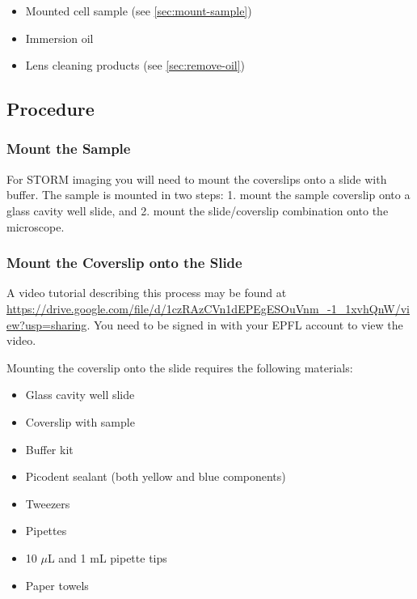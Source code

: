 \documentclass[10pt,a4paper,oneside]{book}
\begin{document}
\begin{itemize}
    \item{Mounted cell sample (see \autoref{sec:mount-sample})}
    \item{Immersion oil}
    \item{Lens cleaning products (see \autoref{sec:remove-oil})}
\end{itemize}

\subsection{Procedure}

\subsubsection{Mount the Sample}\label{sec:mount-sample}

For STORM imaging you will need to mount the coverslips onto a slide with buffer. The sample is mounted in two steps: 1. mount the sample coverslip onto a glass cavity well slide, and 2. mount the slide/coverslip combination onto the microscope.

\subsubsection{Mount the Coverslip onto the Slide}

\newline

A video tutorial describing this process may be found at \url{https://drive.google.com/file/d/1czRAzCVn1dEPEgESOuVnm_-1_1xvhQnW/view?usp=sharing}. You need to be signed in with your EPFL account to view the video.

Mounting the coverslip onto the slide requires the following materials:

\begin{itemize}
    \item{Glass cavity well slide}
    \item{Coverslip with sample}
    \item{Buffer kit}
    \item{Picodent sealant (both yellow and blue components)}
    \item{Tweezers}
    \item{Pipettes}
    \item{10 $\mu$L and 1 mL pipette tips}
    \item{Paper towels}
\end{itemize}
\end{document}
